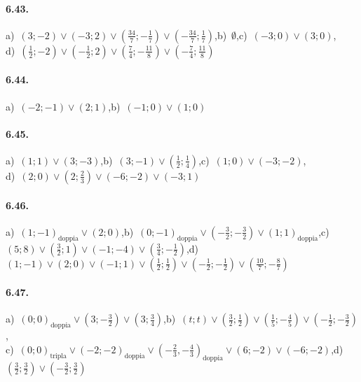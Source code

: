 \paragraph{6.43.} a)~\((3;-2)\vee(-3;2)\vee\left(\frac{34} 7;-\frac 1 7\right)\vee \left(-\frac{34} 7;\frac 1 7\right)\),\quad b)~\(\emptyset\),\quad c)~\((-3;0)\vee(3;0)\),\protect\\
\quad d)~\(\left(\frac 1 2;-2\right)\vee\left(-\frac 1 2;2\right)\vee\left(\frac 7 4;-\frac{11} 8\right)\vee\left(-\frac 7 4;\frac{11} 8\right)\)

\paragraph{6.44.} a)~\((-2;-1)\vee(2;1)\),\quad b)~\((-1;0)\vee(1;0)\)

\paragraph{6.45.} a)~\((1;1)\vee(3;-3)\),\quad b)~\((3;-1)\vee\left(\frac 1 2;\frac 1 4\right)\),\quad c)~\((1;0)\vee(-3;-2)\),\protect\\
\quad d)~\((2;0)\vee\left(2;\frac 2 3\right)\vee(-6;-2)\vee(-3;1)\)

\paragraph{6.46.} a)~\((1;-1)_\text{doppia} \vee(2;0)\),\quad b)~\((0;-1)_\text{doppia}\vee\left(-\frac 3 2;-\frac 3 2\right)\vee(1;1)_\text{doppia}\),\quad c)~\((5;8)\vee\left(\frac 3 2;1\right)\vee(-1;-4)\vee\left(\frac 3 4;-\frac 1 2\right)\),\quad d)~\((1;-1)\vee(2;0)\vee(-1;1)\vee\left(\frac 1 2;\frac 1 2\right)\vee\left(-\frac 1 2;-\frac 1 2\right)\vee\left(\frac{10} 7;-\frac 8 7\right)\)

\paragraph{6.47.}a)~\((0;0)_\text{doppia}\vee\left(3;-\frac 3 2\right)\vee(3;\frac 3 4)\),\quad b)~\((t;t)\vee\left(\frac 3 2;\frac 1 2\right)\vee\left(\frac 1 5;-\frac 4 5\right)\vee\left(-\frac 1 2;-\frac 3 2\right)\),\protect\\
\quad c)~\((0;0)_\text{tripla}\vee(-2;-2)_\text{doppia}\vee\left(-\frac 2 3,-\frac 4 3\right)_\text{doppia}\vee(6;-2)\vee(-6;-2)\),\quad d)~\(\left(\frac 3 2;\frac 3 2\right)\vee\left(-\frac 3 2;\frac 3 2\right)\)

